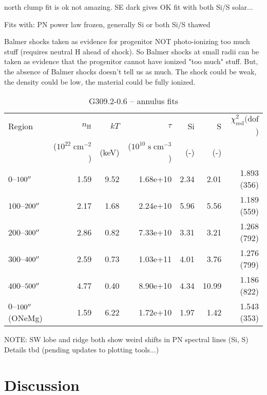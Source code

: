 \documentclass[preprint2,tighten,trackchanges]{aastex6}
\newcommand*{\mt}{\mathrm}
\newcommand*{\unit}[1]{\;\mt{#1}}  %
\begin{document}
north clump fit is ok not amazing.
SE dark gives OK fit with both Si/S solar...

Fits with: PN power law frozen, generally Si or both Si/S thawed



Balmer shocks taken as evidence for progenitor NOT photo-ionizing too much
stuff (requires neutral H ahead of shock).  So Balmer shocks at small radii can
be taken as evidence that the progenitor cannot have ionized "too much" stuff.
But, the absence of Balmer shocks doesn't tell us as much.
The shock could be weak, the density could be low, the material could be fully
ionized.

\begin{table*}
    \centering
    \caption{G309.2-0.6 -- annulus fits}
    \begin{tabular}{@{}lrrrrrr@{}}
        \toprule
        Region & $n_\mathrm{H}$             & $kT$  & $\tau$                        & Si  & S   & $\chi^2_{\mathrm{red}} (\mathrm{dof}$) \\
               & ($10^{22} \unit{cm^{-2}}$) & (keV) & ($10^{10} \unit{s\;cm^{-3}}$) & (-) & (-) &  \\
        \midrule
        $0$--$100\mbox{$^{\prime\prime}$}$ & 1.59 & 9.52 & 1.68e+10 & 2.34 & 2.01 & 1.893 (356) \\  %
        $100$--$200\mbox{$^{\prime\prime}$}$ & 2.17 & 1.68 & 2.24e+10 & 5.96 & 5.56 & 1.189 (559) \\  %
        $200$--$300\mbox{$^{\prime\prime}$}$ & 2.86 & 0.82 & 7.33e+10 & 3.31 & 3.21 & 1.268 (792) \\  %
        $300$--$400\mbox{$^{\prime\prime}$}$ & 2.59 & 0.73 & 1.03e+11 & 4.01 & 3.76 & 1.276 (799) \\  %
        $400$--$500\mbox{$^{\prime\prime}$}$ & 4.77 & 0.40 & 8.90e+10 & 4.34 & 10.99 & 1.186 (822) \\  %
        \midrule
        $0$--$100\mbox{$^{\prime\prime}$}$ (ONeMg) & 1.59 & 6.22 & 1.72e+10 & 1.97 & 1.42 & 1.543 (353) \\  %
        \bottomrule
    \end{tabular}
\end{table*}


NOTE: SW lobe and ridge both show weird shifts in PN spectral lines (Si, S)
Details tbd (pending updates to plotting tools...)


\section{Discussion}
\end{document}
